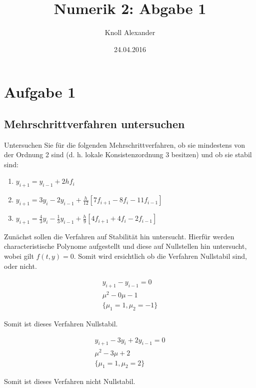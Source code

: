 \documentclass{article}
\author{Knoll Alexander}
\title{Numerik 2: Abgabe 1}
\date{24.04.2016}
\begin{document}
\maketitle
\newpage
\tableofcontents
\newpage



\section{Aufgabe 1}

	\subsection{Mehrschrittverfahren untersuchen}
	
		Untersuchen Sie für die folgenden Mehrschrittverfahren, ob sie mindestens von der Ordnung 2
		sind (d. h. lokale Konsistenzordnung 3 besitzen) und ob sie stabil sind:
	
		\begin{enumerate}[label=(\alph*)]
			\item  $y_{i+1} = y_{i-1} + 2hf_{i}$ 
			\item  $y_{i+1}  = 3y_{i} - 2y_{i-1} + \frac{h}{12}[7f_{i+1} - 8f_{i} - 11f_{i-1}] $ 
			\item  $y_{i+1} = \frac{4}{3}y_{i} - \frac{1}{3}y_{i-1} + \frac{h}{9}[4f_{i+1} + 4f_{i} - 2f_{i-1}]$ 
		\end{enumerate}
		
		Zunächst sollen die Verfahren auf Stabilität hin untersucht. Hierfür werden characteristische Polynome aufgestellt und diese auf Nullstellen hin untersucht, wobei
		gilt $f(t, y) = 0$. Somit wird ersichtlich ob die Verfahren Nullstabil sind, oder nicht.
		
		\begin{align*}
			y_{i+1} - y_{i-1} = 0\\
			\mu^{2} - 0\mu - 1 \\
			\{ \mu_{1} = 1, \mu_{2} = -1\}
		\end{align*}
		
		Somit ist dieses Verfahren Nullstabil.
		
		\begin{align*}
			y_{i+1} - 3y_{i} + 2y_{i-1} = 0\\
			\mu^{2} - 3\mu + 2 \\
			\{ \mu_{1} = 1, \mu_{2} = 2\}
		\end{align*}
		
		Somit ist dieses Verfahren nicht Nullstabil.
		
\end{document}
